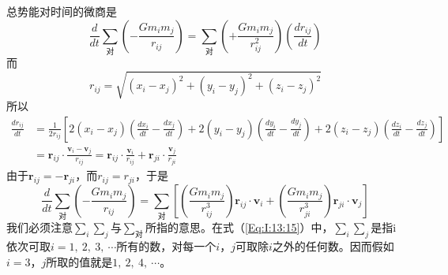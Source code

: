 总势能对时间的微商是
\begin{equation*}
    \frac{d}{dt} \sum_{\text{对}} (-\frac{Gm_im_j}{r_{ij}}) = \sum_{\text{对}} (+\frac{Gm_im_j}{r_{ij}^2}) (\frac{dr_{ij}}{dt}) 
\end{equation*}
而
\begin{equation*}
    r_{ij} = \sqrt{(x_i - x_j)^2 + (y_i - y_j)^2 + (z_i - z_j)^2}
\end{equation*}
所以
\begin{equation*}
    \begin{aligned}
        \frac{dr_{ij}}{dt}&=\frac{1}{2r_{ij}}[2(x_i - x_j)(\frac{dx_i}{dt} - \frac{dx_j}{dt}) + 2(y_i - y_j)(\frac{dy_i}{dt} - \frac{dy_j}{dt}) + 2(z_i - z_j)(\frac{dz_i}{dt} - \frac{dz_j}{dt})] \\
        &=\boldsymbol{r}_{ij} \cdot \frac{\boldsymbol{v}_i - \boldsymbol{v}_j}{r_{ij}}=\boldsymbol{r}_{ij} \cdot \frac{\boldsymbol{v}_i}{r_{ij}} + \boldsymbol{r}_{ji} \cdot \frac{\boldsymbol{v}_j}{r_{ji}}
    \end{aligned}
\end{equation*}
由于$\boldsymbol{r}_{ij} = -\boldsymbol{r}_{ji}$，而$r_{ij}=r_{ji}$，于是
\begin{equation}
    \label{Eq:I:13:16}
    \frac{d}{dt} \sum_{\text{对}} (-\frac{Gm_im_j}{r_{ij}}) = \sum_{\text{对}} [(\frac{Gm_im_j}{r_{ij}^3})\boldsymbol{r}_{ij} \cdot \boldsymbol{v}_{i} + (\frac{Gm_im_j}{r_{ji}^3})\boldsymbol{r}_{ji} \cdot \boldsymbol{v}_{j}]
\end{equation}
我们必须注意$\sum_i{\sum_j}$与$\sum_{\text{对}}$所指的意思。在式（\ref{Eq:I:13:15}）中，$\sum_i{\sum_j}$是指i依次可取$i=1,~2,~3,~ \cdots$所有的数，对每一个$i$，$j$可取除$i$之外的任何数。因而假如$i=3$，$j$所取的值就是$1,~2,~4,~ \cdots$。

